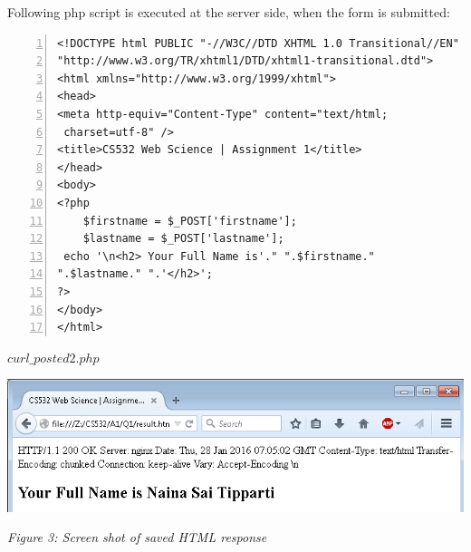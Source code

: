 \newpage
\vspace*{10pt}
Following php script is executed at the server side, when the form is submitted: 
\vspace*{1mm}
\begin{lstlisting}[frame=single,numbers=left]
<!DOCTYPE html PUBLIC "-//W3C//DTD XHTML 1.0 Transitional//EN"
"http://www.w3.org/TR/xhtml1/DTD/xhtml1-transitional.dtd">
<html xmlns="http://www.w3.org/1999/xhtml">
<head>
<meta http-equiv="Content-Type" content="text/html; 
 charset=utf-8" />
<title>CS532 Web Science | Assignment 1</title>
</head>
<body>
<?php
	$firstname = $_POST['firstname'];
	$lastname = $_POST['lastname'];
 echo '\n<h2> Your Full Name is'." ".$firstname." 
".$lastname." ".'</h2>';
?>
</body>
</html>
\end{lstlisting}
\centerline{\textbf{$curl\_posted2.php$}}
\vspace*{5pt}
\begin{center}
	\includegraphics[scale=.975]{Q1/fig4.png}\\
	\centerline{\textit{Figure 3: Screen shot of saved HTML response}}
\end{center}

